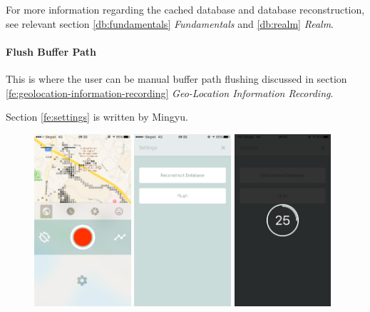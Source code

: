 \documentclass[12pt,a4paper]{article}
\begin{document}
            For more information regarding the cached database and database reconstruction, see relevant section \ref{db:fundamentals} \textit{Fundamentals} and \ref{db:realm} \textit{Realm}.
            
            \paragraph{Flush Buffer Path}
            This is where the user can be manual buffer path flushing discussed in section \ref{fe:geolocation-information-recording} \textit{Geo-Location Information Recording}.
            
            \footnotesize
            Section \ref{fe:settings} is written by Mingyu.
            \normalsize
            
            
            \begin{figure}
                \includegraphics[width=0.32\textwidth]{4-1-8-a}
                \includegraphics[width=0.32\textwidth]{4-1-8-b}
                \includegraphics[width=0.32\textwidth]{4-1-8-c}

\end{figure}
\end{document}
